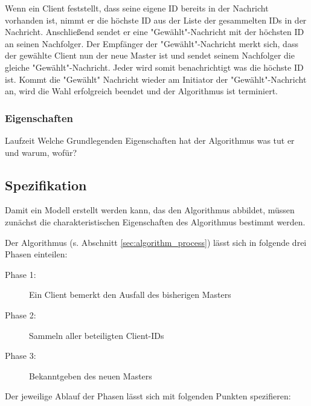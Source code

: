 Wenn ein Client feststellt, dass seine eigene ID bereits in der Nachricht vorhanden ist, nimmt er die höchste ID aus der Liste der gesammelten IDs in der Nachricht. Anschließend sendet er eine "Gewählt"-Nachricht mit der höchsten ID an seinen Nachfolger. Der Empfänger der "Gewählt"-Nachricht merkt sich, dass der gewählte Client nun der neue Master ist und sendet seinem Nachfolger die gleiche "Gewählt"-Nachricht. Jeder wird somit benachrichtigt was die höchste ID ist. Kommt die "Gewählt" Nachricht wieder am Initiator der "Gewählt"-Nachricht an, wird die Wahl erfolgreich beendet und der Algorithmus ist terminiert.

\subsubsection*{Eigenschaften}
 Laufzeit
Welche Grundlegenden Eigenschaften hat der Algorithmus
was tut er und warum, wofür?

\subsection{Spezifikation}
Damit ein Modell erstellt werden kann, das den Algorithmus abbildet, müssen zunächst die charakteristischen Eigenschaften des Algorithmus bestimmt werden.

Der Algorithmus (s. Abschnitt \ref{sec:algorithm_process}) lässt sich in folgende drei Phasen einteilen:
\begin{description}
\item[Phase 1:] Ein Client bemerkt den Ausfall des bisherigen Masters
\item[Phase 2:] Sammeln aller beteiligten Client-IDs
\item[Phase 3:] Bekanntgeben des neuen Masters
\end{description}

Der jeweilige Ablauf der Phasen lässt sich mit folgenden Punkten spezifieren:

